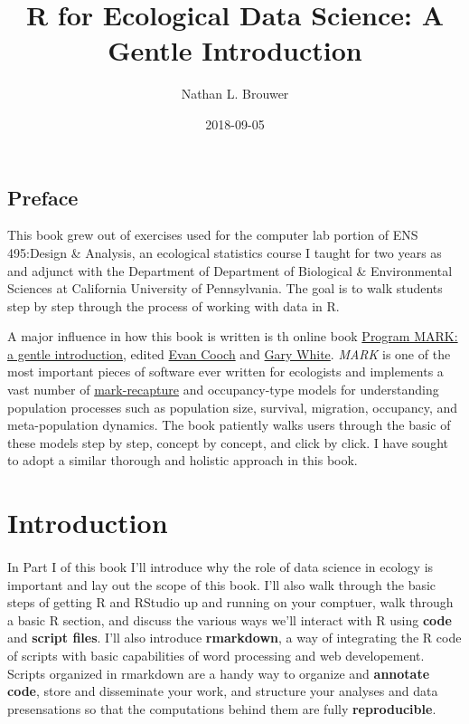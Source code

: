 \documentclass[]{book}
\title{R for Ecological Data Science: A Gentle Introduction}
\author{Nathan L. Brouwer}
\date{2018-09-05}
\theoremstyle{definition}
\theoremstyle{definition}
\theoremstyle{definition}
\theoremstyle{remark}
\begin{document}
\maketitle

{
\setcounter{tocdepth}{1}
\tableofcontents
}
\chapter*{Preface}\label{preface}

This book grew out of exercises used for the computer lab portion of ENS
495:Design \& Analysis, an ecological statistics course I taught for two
years as and adjunct with the Department of Department of Biological \&
Environmental Sciences at California University of Pennsylvania. The
goal is to walk students step by step through the process of working
with data in R.

A major influence in how this book is written is th online book
\href{http://www.phidot.org/software/mark/docs/book/}{Program MARK: a
gentle introduction}, edited \href{http://canuck.dnr.cornell.edu/}{Evan
Cooch} and \href{https://sites.warnercnr.colostate.edu/gwhite/}{Gary
White}. \emph{MARK} is one of the most important pieces of software ever
written for ecologists and implements a vast number of
\href{https://en.wikipedia.org/wiki/Mark_and_recapture}{mark-recapture}
and occupancy-type models for understanding population processes such as
population size, survival, migration, occupancy, and meta-population
dynamics. The book patiently walks users through the basic of these
models step by step, concept by concept, and click by click. I have
sought to adopt a similar thorough and holistic approach in this book.

\part{Introduction}\label{part-introduction}

\subsection*{}\label{section}

In Part I of this book I'll introduce why the role of data science in
ecology is important and lay out the scope of this book. I'll also walk
through the basic steps of getting R and RStudio up and running on your
comptuer, walk through a basic R section, and discuss the various ways
we'll interact with R using \textbf{code} and \textbf{script files}.
I'll also introduce \textbf{rmarkdown}, a way of integrating the R code
of scripts with basic capabilities of word processing and web
developement. Scripts organized in rmarkdown are a handy way to organize
and \textbf{annotate code}, store and disseminate your work, and
structure your analyses and data presensations so that the computations
behind them are fully \textbf{reproducible}.
\end{document}
